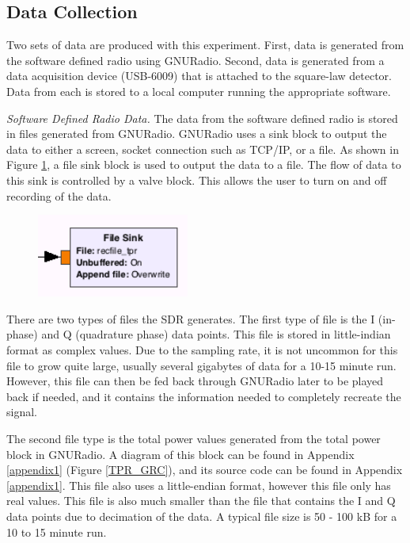 \subsection{Data Collection}\label{exp1_data}

Two sets of data are produced with this experiment.  First, data is generated from the software defined radio using GNURadio.  Second, data is generated from a data acquisition device (USB-6009) that is attached to the square-law detector.  Data from each is stored to a local computer running the appropriate software.

\emph{Software Defined Radio Data.}  The data from the software defined radio is stored in files generated from GNURadio.  GNURadio uses a sink block to output the data to either a screen, socket connection such as TCP/IP, or a file.  As shown in Figure \ref{filesink}, a file sink block is used to output the data to a file.  The flow of data to this sink is controlled by a valve block.  This allows the user to turn on and off recording of the data.

{\begin{figure}[h!tb] \centering
\includegraphics[width=5cm]{Images/TPR_Filesink.png}
\label{filesink}
\end{figure}
}

There are two types of files the SDR generates.  The first type of file is the I (in-phase) and Q (quadrature phase) data points.  This file is stored in little-indian format as complex values.  Due to the sampling rate, it is not uncommon for this file to grow quite large, usually several gigabytes of data for a 10-15 minute run.  However, this file can then be fed back through GNURadio later to be played back if needed, and it contains the information needed to completely recreate the signal.

The second file type is the total power values generated from the total power block in GNURadio.  A diagram of this block can be found in Appendix \ref{appendix1} (Figure \ref{TPR_GRC}), and its source code can be found in Appendix \ref{appendix1}.  This file also uses a little-endian format, however this file only has real values.  This file is also much smaller than the file that contains the I and Q data points due to decimation of the data.  A typical file size is 50 - 100 kB for a 10 to 15 minute run.  

